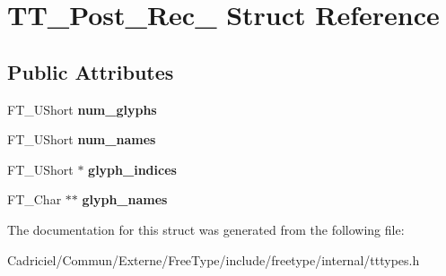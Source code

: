 \hypertarget{struct_t_t___post__20_rec__}{\section{T\-T\-\_\-\-Post\-\_\-Rec\-\_\- Struct Reference}
\label{struct_t_t___post__20_rec__}
}
\subsection*{Public Attributes}
\begin{DoxyCompactItemize}
\item 
\hypertarget{struct_t_t___post__20_rec___ae3de3677810e6581f2c197e8fa902979}{F\-T\-\_\-\-U\-Short {\bfseries num\-\_\-glyphs}}\label{struct_t_t___post__20_rec___ae3de3677810e6581f2c197e8fa902979}

\item 
\hypertarget{struct_t_t___post__20_rec___af726ff4997521c76de36f76e1203e2b1}{F\-T\-\_\-\-U\-Short {\bfseries num\-\_\-names}}\label{struct_t_t___post__20_rec___af726ff4997521c76de36f76e1203e2b1}

\item 
\hypertarget{struct_t_t___post__20_rec___a7f0a07ab96ccbe2597378f7aa2de3f8c}{F\-T\-\_\-\-U\-Short $\ast$ {\bfseries glyph\-\_\-indices}}\label{struct_t_t___post__20_rec___a7f0a07ab96ccbe2597378f7aa2de3f8c}

\item 
\hypertarget{struct_t_t___post__20_rec___a8330fbc7db3659ac621e98d7ceb8aad3}{F\-T\-\_\-\-Char $\ast$$\ast$ {\bfseries glyph\-\_\-names}}\label{struct_t_t___post__20_rec___a8330fbc7db3659ac621e98d7ceb8aad3}

\end{DoxyCompactItemize}


The documentation for this struct was generated from the following file\-:\begin{DoxyCompactItemize}
\item 
Cadriciel/\-Commun/\-Externe/\-Free\-Type/include/freetype/internal/tttypes.\-h\end{DoxyCompactItemize}
